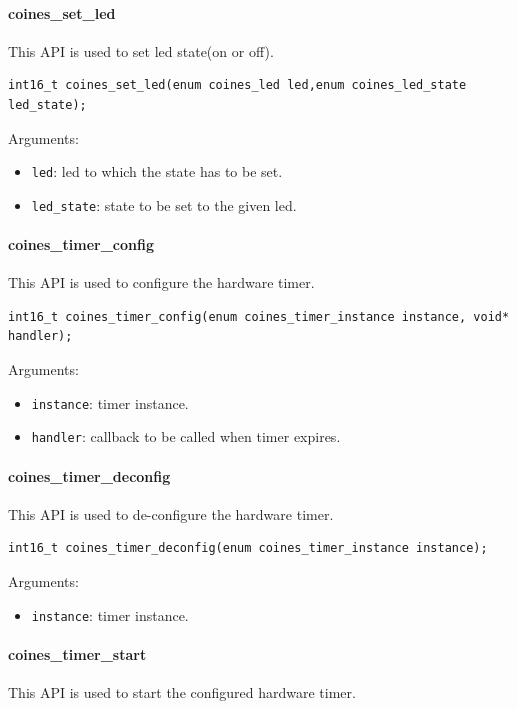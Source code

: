 \paragraph{coines\_set\_led}
 This API is used to set led state(on or off).
 
\begin{lstlisting}
int16_t coines_set_led(enum coines_led led,enum coines_led_state led_state);
\end{lstlisting}

Arguments:
\begin{itemize}
	\item \texttt{led}: led to which the state has to be set.
	\item \texttt{led\_state}: state to be set to the given led.
\end{itemize}

\paragraph{coines\_timer\_config}
 This API is used to configure the hardware timer.
 
\begin{lstlisting}
int16_t coines_timer_config(enum coines_timer_instance instance, void* handler);
\end{lstlisting}

Arguments:
\begin{itemize}
	\item \texttt{instance}: timer instance.
	\item \texttt{handler}: callback to be called when timer expires.
\end{itemize}

\paragraph{coines\_timer\_deconfig}
 This API is used to de-configure the hardware timer.
 
\begin{lstlisting}
int16_t coines_timer_deconfig(enum coines_timer_instance instance);
\end{lstlisting}

Arguments:
\begin{itemize}
	\item \texttt{instance}: timer instance.
\end{itemize}

\paragraph{coines\_timer\_start}
 This API is used to start the configured hardware timer.
 
